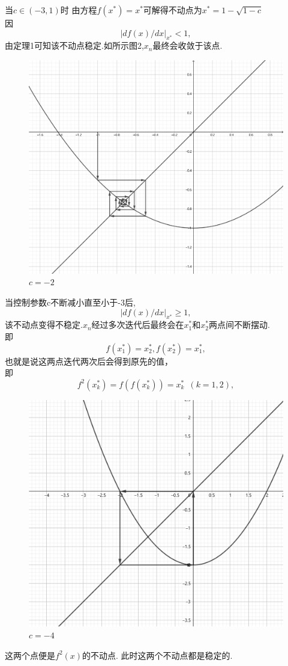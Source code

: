 \documentclass[a4paper]{article}%
\newcommand*\abs[1]{\lvert#1\rvert}%
\begin{document}
当$c\in (-3,1)$时
由方程$f(x^*)=x^*$可解得不动点为$x^{*}=1-\sqrt{1-c}$\\
因
\[ \abs{df(x)/dx}_{x^*}<1,\]由{定理1}可知该不动点稳定.如所示图2,$x_n$最终会收敛于该点.
\begin{figure}[ht]
    \centering
    \includegraphics[scale=4.8]{图二}
    \caption[图二]{$c=-2$}\label{fig-图二}
    \end{figure}


当控制参数c不断减小直至小于-3后,
\[\abs{df(x)/dx}_{x^*}\ge1,\]
该不动点变得不稳定.$x_n$经过多次迭代后最终会在$x^*_1$和$x^*_2$两点间不断摆动.\\
即
\[f(x^*_1)=x^*_2,f(x^*_2)=x^*_1,\]
也就是说这两点迭代两次后会得到原先的值，\\
即
\[f^{2}(x^*_k)=f(f(x^*_k))=x^*_k \phantom{1} (k=1,2),\]
\begin{figure}[h]
    \centering
    \includegraphics[scale=1.8]{图三}
    \caption[图三]{$c=-4$}\label{fig-图三}
    \end{figure}
这两个点便是$f^2(x)$的不动点.
此时这两个不动点都是稳定的.
\end{document}
